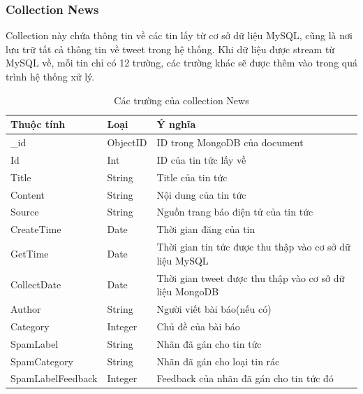 		\subsubsection{Collection News}
		Collection này chứa thông tin về các tin lấy từ cơ sở dữ liệu MySQL, cũng là nơi lưu trữ tất cả thông tin về tweet trong hệ thống. Khi dữ liệu được stream từ MySQL về, mỗi tin chỉ có 12 trường, các trường khác sẽ được thêm vào trong quá trình hệ thống xử lý.
		\begin{table}[H]
			\setlength\extrarowheight{3pt}
			\begin{tabular}{|l|l|p{7.25cm}|}
				\hline
				\textbf{Thuộc tính}     & \textbf{Loại} & \textbf{Ý nghĩa} \\\hline
				\_id           & ObjectID       & ID trong MongoDB của document \\\hline
				Id        & Int           & ID của tin tức lấy về\\\hline
				Title         & String           & Title của tin tức\\\hline
				Content & String         & Nội dung của tin tức\\\hline
				Source   & String         & Nguồn trang báo điện tử của tin tức\\\hline
				CreateTime  & Date           & Thời gian đăng của tin\\\hline
				GetTime    & Date           & Thời gian tin tức được thu thập vào cơ sở dữ liệu MySQL\\\hline
				CollectDate    & Date           & Thời gian tweet được thu thập vào cơ sở dữ liệu MongoDB\\\hline
				Author  & String        & Người viết bài báo(nếu có)\\\hline
				Category   & Integer        & Chủ đề của bài báo\\\hline
				SpamLabel & String        & Nhãn đã gán cho tin tức\\\hline
				SpamCategory   & String         & Nhãn đã gán cho loại tin rác\\\hline
				SpamLabelFeedback      & Integer        & Feedback của nhãn đã gán cho tin tức đó\\\hline
			\end{tabular}%
			
			\caption{Các trường của collection News}
			\label{tab:table_3_2}%
		\end{table}%
		
